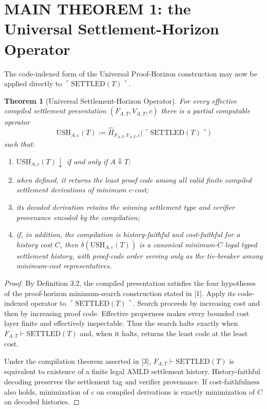 \documentclass[11pt]{article}
\newtheorem{theorem}{Theorem}[section]
\theoremstyle{definition}
\newcommand{\SETTLED}{\ensuremath{\mathrm{SETTLED}}}
\newcommand{\USH}{\ensuremath{\mathrm{USH}}}
\begin{document}
\section{MAIN THEOREM 1: the Universal Settlement-Horizon Operator}
The code-indexed form of the Universal Proof-Horizon construction may now be applied directly to $\ulcorner\SETTLED(T)\urcorner$.

\begin{theorem}[Universal Settlement-Horizon Operator]
For every effective compiled settlement presentation $(F_{A,T},V_{A,T},c)$ there is a partial computable operator
\[
\USH_{A,c}(T)
:=
\widehat H_{F_{A,T},V_{A,T},c}
\bigl(\ulcorner\SETTLED(T)\urcorner\bigr)
\]
such that:
\begin{enumerate}[label=(\roman*)]
\item $\USH_{A,c}(T)\downarrow$ if and only if $A\Downarrow T$;
\item when defined, it returns the least proof code among all valid finite compiled settlement derivations of minimum $c$-cost;
\item its decoded derivation retains the winning settlement type and verifier provenance encoded by the compilation;
\item if, in addition, the compilation is history-faithful and cost-faithful for a history cost $C$, then $\delta(\USH_{A,c}(T))$ is a canonical minimum-$C$ legal typed settlement history, with proof-code order serving only as the tie-breaker among minimum-cost representatives.
\end{enumerate}
\end{theorem}

\begin{proof}
By Definition 3.2, the compiled presentation satisfies the four hypotheses of the proof-horizon minimum-search construction stated in [1]. Apply its code-indexed operator to $\ulcorner\SETTLED(T)\urcorner$. Search proceeds by increasing cost and then by increasing proof code. Effective properness makes every bounded cost layer finite and effectively inspectable. Thus the search halts exactly when $F_{A,T}\vdash\SETTLED(T)$ and, when it halts, returns the least code at the least cost.

Under the compilation theorem asserted in [3], $F_{A,T}\vdash\SETTLED(T)$ is equivalent to existence of a finite legal AMLD settlement history. History-faithful decoding preserves the settlement tag and verifier provenance. If cost-faithfulness also holds, minimization of $c$ on compiled derivations is exactly minimization of $C$ on decoded histories.
\end{proof}
\end{document}
